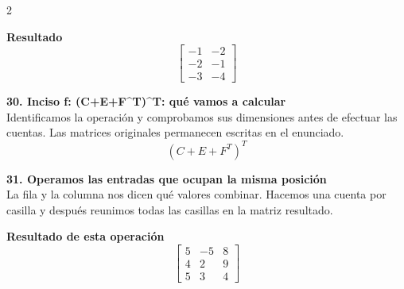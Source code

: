 \documentclass[11pt,a4paper,landscape]{article}
\begin{document}
\begin{multicols*}{2}
\begin{minipage}{\linewidth}
\par\smallskip \textbf{Resultado}\[\begin{bmatrix}-1 & -2\\-2 & -1\\-3 & -4\end{bmatrix}\]
\end{minipage}\par\medskip
\noindent\begin{minipage}{\linewidth}\textbf{30. Inciso f: (C+E+F\textasciicircum{}T)\textasciicircum{}T: qué vamos a calcular}\\[2pt]Identificamos la operación y comprobamos sus dimensiones antes de efectuar las cuentas. Las matrices originales permanecen escritas en el enunciado.
\[(C+E+F^T)^T\]
\end{minipage}\par\medskip
\noindent\begin{minipage}{\linewidth}\textbf{31. Operamos las entradas que ocupan la misma posición}\\[2pt]La fila y la columna nos dicen qué valores combinar. Hacemos una cuenta por casilla y después reunimos todas las casillas en la matriz resultado.
\par{}\par\smallskip
\par\smallskip \textbf{Resultado de esta operación}\[\begin{bmatrix}5 & -5 & 8\\4 & 2 & 9\\5 & 3 & 4\end{bmatrix}\]

\end{minipage}
\end{multicols*}
\end{document}
